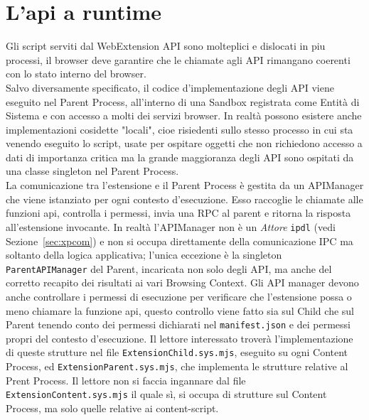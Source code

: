 \documentclass{sapthesis}
\newcommand{\code}[1]{\texttt{#1}}
\newcommand{\file}[1]{\code{#1}}
\newcommand{\refSection}[1]{Sezione~\ref{#1}}
\newcommand{\manifest}{\code{manifest.json}}
\newcommand{\ipdl}{\code{ipdl}}
\begin{document}
    \section{L'api a runtime}
    \label{sec:webextension-api-rpc}

        Gli script serviti dal WebExtension API sono molteplici e dislocati in piu processi,
        il browser deve garantire che le chiamate agli API rimangano coerenti con lo stato interno
        del browser. \\
        Salvo diversamente specificato, il codice d'implementazione degli API viene
        eseguito nel Parent Process, all'interno di una Sandbox registrata come Entità di Sistema
        e con accesso a molti dei servizi browser. In realtà possono esistere anche implementazioni
        cosidette "locali", cioe risiedenti sullo stesso processo in cui sta venendo eseguito lo
        script, usate per ospitare oggetti che non richiedono accesso a dati di importanza critica
        ma la grande maggioranza degli API sono ospitati da una classe singleton nel Parent Process.\\

        La comunicazione tra l'estensione e il Parent Process è gestita da un APIManager che viene
        istanziato per ogni contesto d'esecuzione. Esso raccoglie le chiamate alle funzioni api,
        controlla i permessi, invia una RPC al parent e ritorna la risposta all'estensione invocante.
        In realtà l'APIManager non è un \textit{Attore} \ipdl{} (vedi \refSection{sec:xpcom}) e non si
        occupa direttamente della comunicazione IPC ma soltanto della logica applicativa; l'unica
        eccezione è la singleton \code{ParentAPIManager} del Parent, incaricata non solo degli API, ma
        anche del corretto recapito dei risultati ai vari Browsing Context.
        Gli API manager devono anche controllare i permessi di esecuzione per verificare che l'estensione
        possa o meno chiamare la funzione api, questo controllo viene fatto sia sul Child che sul Parent
        tenendo conto dei permessi dichiarati nel \manifest{} e dei permessi propri del contesto d'esecuzione.
        Il lettore interessato troverà l'implementazione di queste strutture nel file \file{ExtensionChild.sys.mjs},
        eseguito su ogni Content Process, ed \file{ExtensionParent.sys.mjs}, che implementa le strutture
        relative al Prent Process. Il lettore non si faccia ingannare dal file \file{ExtensionContent.sys.mjs} 
        il quale sì, si occupa di strutture sul Content Process, ma solo quelle relative ai content-script.
\end{document}
